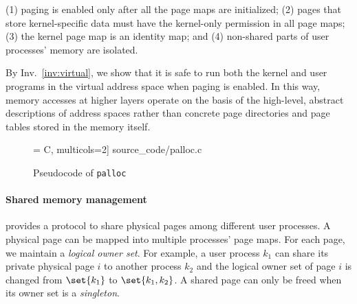\begin{invariant}
\label{inv:virtual}
(1) paging is enabled only after all the page maps are initialized;
(2) pages that store kernel-specific data must have the kernel-only
permission in all page maps; (3) the kernel page map is an identity map;
and (4) non-shared parts of user processes' memory are isolated.
\end{invariant}

By Inv.~\ref{inv:virtual}, we show that it is safe to run both the
kernel and user programs in the virtual address space when paging is
enabled.  In this way, memory accesses at higher layers operate on the
basis of the high-level, abstract descriptions of address spaces
rather than concrete page directories and page tables stored in the
memory itself.

\begin{figure}[t]
 = C, multicols=2] {source_code/palloc.c}
\caption{Pseudocode of \texttt{palloc}}
\label{fig:exp:palloc}
\vspace*{-5pt}
\end{figure}

\vspace*{-10pt}
\paragraph{Shared memory management} provides a protocol to share physical
pages among different user processes. 
A physical page can be mapped into multiple processes' page maps.  
For each page, we maintain a \emph{logical owner set}.  
For example, a
user process $k_1$ can share its private physical page $i$ to another
 process $k_2$ and the logical owner
set of page $i$ is changed from $\set{k_1}$ to $\set{k_1,k_2}$.
A shared page can only be
freed when its owner set is a \emph{singleton}.

\ignore{\begin{figure}
 = C, multicols=1] {source_code/enqueue.v}
\vspace{-5pt}
\caption{Specifications of local queue operations}
\label{fig:exp:queue}
\vspace{-10pt}
\end{figure}}

